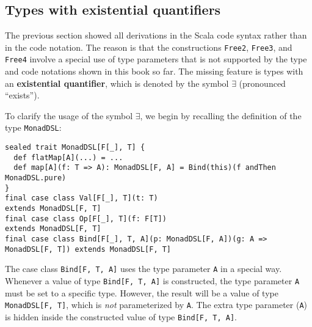 \subsection{Types with existential quantifiers}

The previous section showed all derivations in the Scala code syntax
rather than in the code notation. The reason is that the constructions
\lstinline!Free2!, \lstinline!Free3!,
and \lstinline!Free4! involve
a special use of type parameters that is not supported by the type
and code notations shown in this book so far. The missing feature
is types with an \textbf{existential quantifier},
which is denoted by the symbol $\exists$ (pronounced \textsf{``}exists\textsf{''}).

To clarify the usage of the symbol $\exists$, we begin by recalling
the definition of the type \lstinline!MonadDSL!:
\begin{lstlisting}
sealed trait MonadDSL[F[_], T] {
  def flatMap[A](...) = ...
  def map[A](f: T => A): MonadDSL[F, A] = Bind(this)(f andThen MonadDSL.pure)
}
final case class Val[F[_], T](t: T)                                          extends MonadDSL[F, T]
final case class Op[F[_], T](f: F[T])                                        extends MonadDSL[F, T]
final case class Bind[F[_], T, A](p: MonadDSL[F, A])(g: A => MonadDSL[F, T]) extends MonadDSL[F, T]
\end{lstlisting}
The case class \lstinline!Bind[F, T, A]!
uses the type parameter \lstinline!A!
in a special way. Whenever a value of type \lstinline!Bind[F, T, A]!
is constructed, the type parameter \lstinline!A!
must be set to a specific type. However, the result will be a value
of type \lstinline!MonadDSL[F, T]!,
which is \emph{not} parameterized by \lstinline!A!.
The extra type parameter (\lstinline!A!)
is hidden inside the constructed value of type \lstinline!Bind[F, T, A]!.

